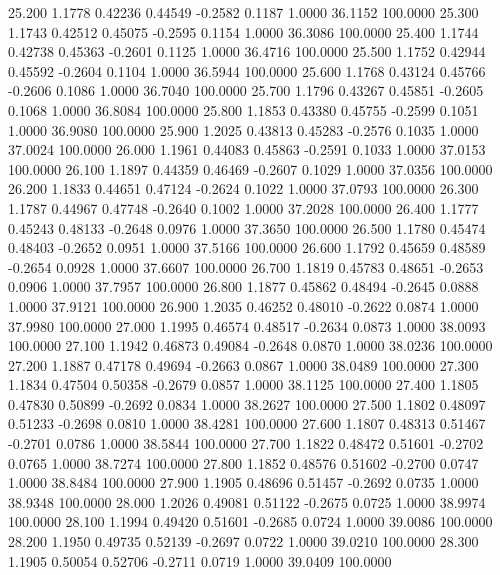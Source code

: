   25.200   1.1778   0.42236   0.44549  -0.2582   0.1187   1.0000  36.1152 100.0000
  25.300   1.1743   0.42512   0.45075  -0.2595   0.1154   1.0000  36.3086 100.0000
  25.400   1.1744   0.42738   0.45363  -0.2601   0.1125   1.0000  36.4716 100.0000
  25.500   1.1752   0.42944   0.45592  -0.2604   0.1104   1.0000  36.5944 100.0000
  25.600   1.1768   0.43124   0.45766  -0.2606   0.1086   1.0000  36.7040 100.0000
  25.700   1.1796   0.43267   0.45851  -0.2605   0.1068   1.0000  36.8084 100.0000
  25.800   1.1853   0.43380   0.45755  -0.2599   0.1051   1.0000  36.9080 100.0000
  25.900   1.2025   0.43813   0.45283  -0.2576   0.1035   1.0000  37.0024 100.0000
  26.000   1.1961   0.44083   0.45863  -0.2591   0.1033   1.0000  37.0153 100.0000
  26.100   1.1897   0.44359   0.46469  -0.2607   0.1029   1.0000  37.0356 100.0000
  26.200   1.1833   0.44651   0.47124  -0.2624   0.1022   1.0000  37.0793 100.0000
  26.300   1.1787   0.44967   0.47748  -0.2640   0.1002   1.0000  37.2028 100.0000
  26.400   1.1777   0.45243   0.48133  -0.2648   0.0976   1.0000  37.3650 100.0000
  26.500   1.1780   0.45474   0.48403  -0.2652   0.0951   1.0000  37.5166 100.0000
  26.600   1.1792   0.45659   0.48589  -0.2654   0.0928   1.0000  37.6607 100.0000
  26.700   1.1819   0.45783   0.48651  -0.2653   0.0906   1.0000  37.7957 100.0000
  26.800   1.1877   0.45862   0.48494  -0.2645   0.0888   1.0000  37.9121 100.0000
  26.900   1.2035   0.46252   0.48010  -0.2622   0.0874   1.0000  37.9980 100.0000
  27.000   1.1995   0.46574   0.48517  -0.2634   0.0873   1.0000  38.0093 100.0000
  27.100   1.1942   0.46873   0.49084  -0.2648   0.0870   1.0000  38.0236 100.0000
  27.200   1.1887   0.47178   0.49694  -0.2663   0.0867   1.0000  38.0489 100.0000
  27.300   1.1834   0.47504   0.50358  -0.2679   0.0857   1.0000  38.1125 100.0000
  27.400   1.1805   0.47830   0.50899  -0.2692   0.0834   1.0000  38.2627 100.0000
  27.500   1.1802   0.48097   0.51233  -0.2698   0.0810   1.0000  38.4281 100.0000
  27.600   1.1807   0.48313   0.51467  -0.2701   0.0786   1.0000  38.5844 100.0000
  27.700   1.1822   0.48472   0.51601  -0.2702   0.0765   1.0000  38.7274 100.0000
  27.800   1.1852   0.48576   0.51602  -0.2700   0.0747   1.0000  38.8484 100.0000
  27.900   1.1905   0.48696   0.51457  -0.2692   0.0735   1.0000  38.9348 100.0000
  28.000   1.2026   0.49081   0.51122  -0.2675   0.0725   1.0000  38.9974 100.0000
  28.100   1.1994   0.49420   0.51601  -0.2685   0.0724   1.0000  39.0086 100.0000
  28.200   1.1950   0.49735   0.52139  -0.2697   0.0722   1.0000  39.0210 100.0000
  28.300   1.1905   0.50054   0.52706  -0.2711   0.0719   1.0000  39.0409 100.0000
